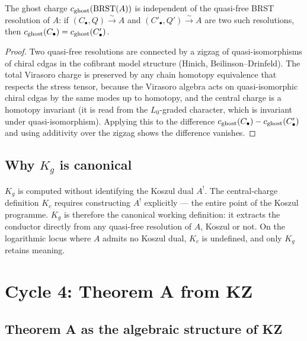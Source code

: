 \begin{proposition}
\label{prop:climax17-K-welldef}
\ClaimStatusProvedHere
The ghost charge $c_{\mathrm{ghost}}(\mathrm{BRST}(A))$ is independent of the quasi-free
BRST resolution of $A$: if $(C_\bullet,Q)\xrightarrow{\sim}A$ and
$(C'_\bullet,Q')\xrightarrow{\sim}A$ are two such resolutions, then
$c_{\mathrm{ghost}}(C_\bullet)=c_{\mathrm{ghost}}(C'_\bullet)$.
\end{proposition}

\begin{proof}
Two quasi-free resolutions are connected by a zigzag of
quasi-isomorphisms of chiral cdgas in the cofibrant model structure
(Hinich, Beilinson--Drinfeld). The total Virasoro charge is preserved
by any chain homotopy equivalence that respects the stress tensor,
because the Virasoro algebra acts on quasi-isomorphic chiral cdgas by
the same modes up to homotopy, and the central charge is a homotopy
invariant (it is read from the $L_0$-graded character, which is
invariant under quasi-isomorphism). Applying this to the difference
$c_{\mathrm{ghost}}(C_\bullet)-c_{\mathrm{ghost}}(C'_\bullet)$ and using additivity over
the zigzag shows the difference vanishes.
\end{proof}

\subsection{Why $K_g$ is canonical}

\begin{remark}[Canonicity of $K_g$]
\label{rem:climax17-Kg-canonical}
$K_g$ is computed without identifying the Koszul dual $A^!$. The
central-charge definition $K_c$ requires constructing $A^!$
explicitly --- the entire point of the Koszul programme. $K_g$ is
therefore the canonical working definition: it extracts the conductor
directly from any quasi-free resolution of $A$, Koszul or not. On the
logarithmic locus where $A$ admits no Koszul dual, $K_c$ is undefined,
and only $K_g$ retains meaning.
\end{remark}

\section{Cycle 4: Theorem A from KZ}
\label{sec:climax17-cycle4}

\subsection{Theorem A as the algebraic structure of KZ}

